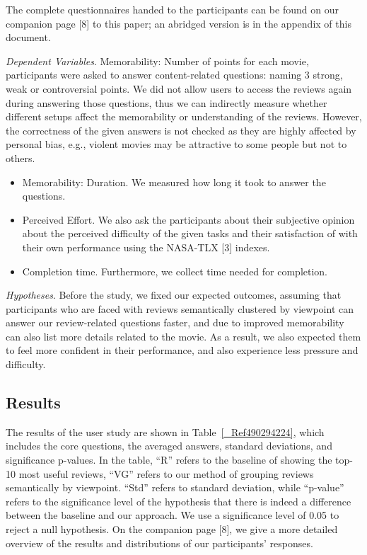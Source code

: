 \documentclass[runningheads,a4paper]{llncs}
\begin{document}
The complete questionnaires handed to the participants can be found on our companion page [8] to this paper; an abridged version is in the appendix of this document.

{\em Dependent Variables}. Memorability: Number of points for each movie, participants were asked to answer content-related questions: naming 3 strong, weak or controversial points. We did not allow users to access the reviews again during answering those questions, thus we can indirectly measure whether different setups affect the memorability or understanding of the reviews. However, the correctness of the given answers is not checked as they are highly affected by personal bias, e.g., violent movies may be attractive to some people but not to others.
\begin{itemize}
\item Memorability: Duration. We measured how long it took to answer the questions.
\item Perceived Effort. We also ask the participants about their subjective opinion about the perceived difficulty of the given tasks and their satisfaction of with their own performance using the NASA-TLX [3] indexes.
\item Completion time.  Furthermore, we collect time needed for completion.
\end{itemize}

{\em Hypotheses}. Before the study, we fixed our expected outcomes, assuming that participants who are faced with reviews semantically clustered by viewpoint can answer our review-related questions faster, and due to improved memorability can also list more details related to the movie. As a result, we also expected them to feel more confident in their performance, and also experience less pressure and difficulty.

\subsection{Results}

The results of the user study are shown in Table~\ref{_Ref490294224}, which includes the core questions, the averaged answers, standard deviations, and significance p-values. In the table, ``R'' refers to the baseline of showing the top-10 most useful reviews, ``VG'' refers to our method of grouping reviews semantically by viewpoint.  ``Std'' refers to standard deviation, while ``p-value'' refers to the significance level of the hypothesis that there is indeed a difference between the baseline and our approach. We use a significance level of 0.05 to reject a null hypothesis. On the companion page [8], we give a more detailed overview of the results and distributions of our participants' responses.
\end{document}
